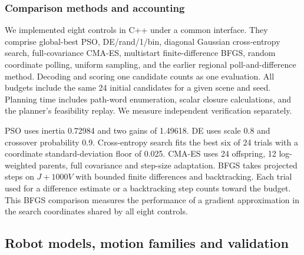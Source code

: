 \subsubsection{Comparison methods and accounting}
We implemented eight controls in C++ under a common interface. They comprise global-best PSO, DE/rand/1/bin, diagonal Gaussian cross-entropy search, full-covariance CMA-ES, multistart finite-difference BFGS, random coordinate polling, uniform sampling, and the earlier regional poll-and-difference method. Decoding and scoring one candidate counts as one evaluation. All budgets include the same 24 initial candidates for a given scene and seed. Planning time includes path-word enumeration, scalar closure calculations, and the planner's feasibility replay. We measure independent verification separately.

PSO uses inertia 0.72984 and two gains of 1.49618. DE uses scale 0.8 and crossover probability 0.9. Cross-entropy search fits the best six of 24 trials with a coordinate standard-deviation floor of 0.025. CMA-ES uses 24 offspring, 12 log-weighted parents, full covariance and step-size adaptation. BFGS takes projected steps on $J+1000V$ with bounded finite differences and backtracking. Each trial used for a difference estimate or a backtracking step counts toward the budget. This BFGS comparison measures the performance of a gradient approximation in the search coordinates shared by all eight controls.

\subsection{Robot models, motion families and validation}
